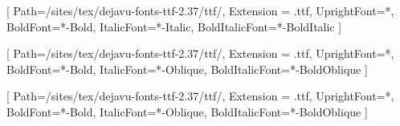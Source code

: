 
\usepackage{fontspec}


\setmainfont{DejaVuSerif}[
    Path=/sites/tex/dejavu-fonts-ttf-2.37/ttf/,
    Extension = .ttf,
    UprightFont=*,
    BoldFont=*-Bold,
    ItalicFont=*-Italic,
    BoldItalicFont=*-BoldItalic
    ]

\setsansfont{DejaVuSans}[
    Path=/sites/tex/dejavu-fonts-ttf-2.37/ttf/,
    Extension = .ttf,
    UprightFont=*,
    BoldFont=*-Bold,
    ItalicFont=*-Oblique,
    BoldItalicFont=*-BoldOblique
    ]

\setmonofont{DejaVuSansMono}[
    Path=/sites/tex/dejavu-fonts-ttf-2.37/ttf/,
    Extension = .ttf,
    UprightFont=*,
    BoldFont=*-Bold,
    ItalicFont=*-Oblique,
    BoldItalicFont=*-BoldOblique
    ]


